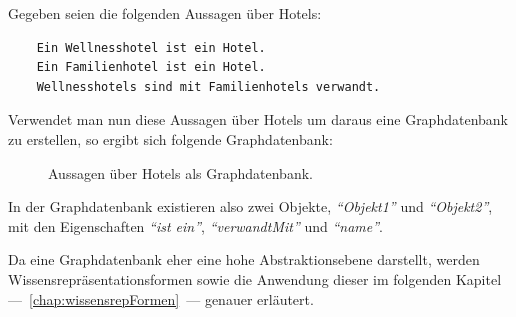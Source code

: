 \newpage

Gegeben seien die folgenden Aussagen über Hotels:
\begin{lstlisting}
    Ein Wellnesshotel ist ein Hotel.
    Ein Familienhotel ist ein Hotel.
    Wellnesshotels sind mit Familienhotels verwandt.
\end{lstlisting}

Verwendet man nun diese Aussagen über Hotels um daraus eine Graphdatenbank zu erstellen, so ergibt sich folgende Graphdatenbank:
\begin{figure}[htbp]
\centering {}
\caption{Aussagen über Hotels als Graphdatenbank.\label{fig:hotels_graphdatenbank}\protect\footnotemark}
\end{figure}

In der Graphdatenbank existieren also zwei Objekte, \textit{``Objekt1''} und \textit{``Objekt2''}, mit den Eigenschaften \textit{``ist ein''}, \textit{``verwandtMit''} und \textit{``name''}.

Da eine Graphdatenbank eher eine hohe Abstraktionsebene darstellt, werden Wissensrepräsentationsformen sowie die Anwendung dieser im folgenden Kapitel ---~\ref{chap:wissensrepFormen}~--- genauer erläutert.
